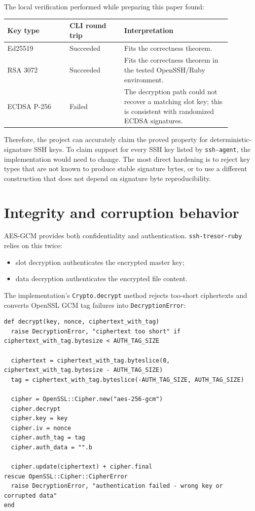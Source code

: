 \documentclass[11pt]{article}
\theoremstyle{definition}
\theoremstyle{plain}
\newcommand{\Project}{\texttt{ssh-tresor-ruby}}
\begin{document}
The local verification performed while preparing this paper found:

\begin{longtable}{p{0.25\linewidth}p{0.22\linewidth}p{0.43\linewidth}}
\toprule
Key type & CLI round trip & Interpretation \\
\midrule
\endhead
Ed25519 & Succeeded & Fits the correctness theorem. \\
RSA 3072 & Succeeded & Fits the correctness theorem in the tested OpenSSH/Ruby environment. \\
ECDSA P-256 & Failed & The decryption path could not recover a matching slot key; this is consistent with randomized ECDSA signatures. \\
\bottomrule
\end{longtable}

Therefore, the project can accurately claim the proved property for deterministic-signature SSH keys. To claim support for every SSH key listed by \texttt{ssh-agent}, the implementation would need to change. The most direct hardening is to reject key types that are not known to produce stable signature bytes, or to use a different construction that does not depend on signature byte reproducibility.

\section{Integrity and corruption behavior}

AES-GCM provides both confidentiality and authentication. \Project{} relies on this twice:

\begin{itemize}[leftmargin=*]
  \item slot decryption authenticates the encrypted master key;
  \item data decryption authenticates the encrypted file content.
\end{itemize}

The implementation's \texttt{Crypto.decrypt} method rejects too-short ciphertexts and converts OpenSSL GCM tag failures into \texttt{DecryptionError}:

\begin{lstlisting}[style=rubycode,caption={Authentication failure handling from lib/ssh\_tresor/crypto.rb.}]
def decrypt(key, nonce, ciphertext_with_tag)
  raise DecryptionError, "ciphertext too short" if ciphertext_with_tag.bytesize < AUTH_TAG_SIZE

  ciphertext = ciphertext_with_tag.byteslice(0, ciphertext_with_tag.bytesize - AUTH_TAG_SIZE)
  tag = ciphertext_with_tag.byteslice(-AUTH_TAG_SIZE, AUTH_TAG_SIZE)

  cipher = OpenSSL::Cipher.new("aes-256-gcm")
  cipher.decrypt
  cipher.key = key
  cipher.iv = nonce
  cipher.auth_tag = tag
  cipher.auth_data = "".b

  cipher.update(ciphertext) + cipher.final
rescue OpenSSL::Cipher::CipherError
  raise DecryptionError, "authentication failed - wrong key or corrupted data"
end
\end{lstlisting}
\end{document}
